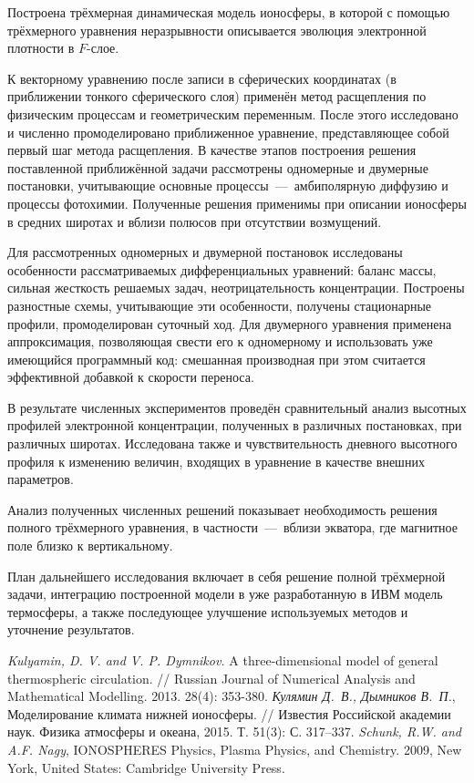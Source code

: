 \documentclass[14pt, a4paper, fleqn]{extarticle}
\begin{document}
Построена трёхмерная динамическая модель ионосферы, в которой с помощью трёхмерного уравнения неразрывности описывается эволюция электронной плотности в $F$-слое.

К векторному уравнению после записи в сферических координатах (в приближении тонкого сферического слоя) применён метод расщепления по физическим процессам и геометрическим переменным. После этого исследовано и численно промоделировано приближенное уравнение, представляющее собой первый шаг метода расщепления. В качестве этапов построения решения поставленной приближённой задачи рассмотрены одномерные и двумерные постановки, учитывающие основные процессы~---~амбиполярную диффузию и процессы фотохимии. Полученные решения применимы при описании ионосферы в средних широтах и вблизи полюсов при отсутствии возмущений.

Для рассмотренных одномерных и двумерной постановок исследованы особенности рассматриваемых дифференциальных уравнений: баланс массы, сильная жесткость решаемых задач, неотрицательность концентрации. Построены разностные схемы, учитывающие эти особенности, получены стационарные профили, промоделирован суточный ход. Для двумерного уравнения применена аппроксимация, позволяющая свести его к одномерному и использовать уже имеющийся программный код: смешанная производная при этом считается эффективной добавкой к скорости переноса.

В результате численных экспериментов проведён сравнительный анализ высотных профилей электронной концентрации, полученных в различных постановках, при различных широтах. Исследована также и чувствительность дневного высотного профиля к изменению величин, входящих в уравнение в качестве внешних параметров.

Анализ полученных численных решений показывает необходимость решения полного трёхмерного уравнения, в частности~---~вблизи экватора, где магнитное поле близко к вертикальному.

План дальнейшего исследования включает в себя решение полной трёхмерной задачи, интеграцию построенной модели в уже разработанную в ИВМ модель термосферы, а также последующее улучшение используемых методов и уточнение результатов.

\newpage
{}

\begin{thebibliography}{00}
\textit{Kulyamin, D. V. and V. P. Dymnikov.} A three-dimensional model of general thermospheric circulation. // Russian Journal of Numerical Analysis and Mathematical Modelling. 2013. 28(4): 353-380.
\textit{Кулямин Д.~В., Дымников В.~П.}, Моделирование климата нижней ионосферы. // Известия Российской академии наук. Физика атмосферы и океана, 2015. Т. 51(3): С. 317–337.
\textit{Schunk, R.W. and A.F. Nagy}, IONOSPHERES Physics, Plasma Physics, and Chemistry. 2009, New York, United States: Cambridge University Press.
\end{thebibliography}
\end{document}
